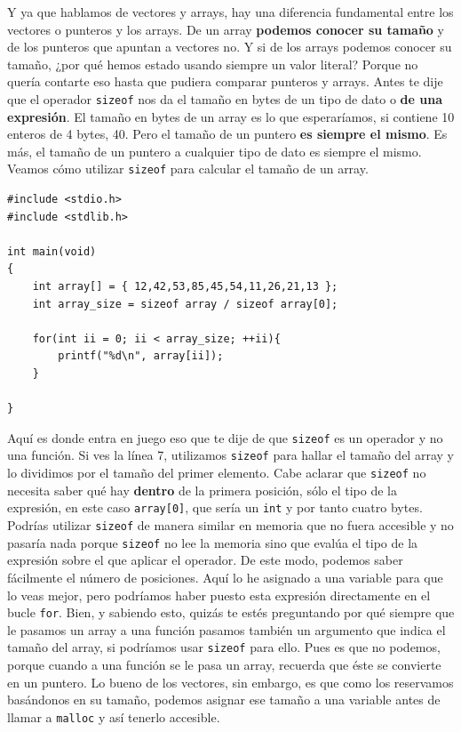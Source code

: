 \documentclass[a4paper]{article}
\begin{document}
Y ya que hablamos de vectores y arrays, hay una diferencia fundamental entre
los vectores o punteros y los arrays. De un array \textbf{podemos conocer su
tamaño} y de los punteros que apuntan a vectores no. Y si de los arrays podemos
conocer su tamaño, ¿por qué hemos estado usando siempre un valor literal? Porque
no quería contarte eso hasta que pudiera comparar punteros y arrays. Antes te
dije que el operador \verb!sizeof! nos da el tamaño en bytes de un tipo de dato
o \textbf{de una expresión}. El tamaño en bytes de un array es lo que
esperaríamos, si contiene 10 enteros de 4 bytes, 40. Pero el tamaño de un
puntero \textbf{es siempre el mismo}. Es más, el tamaño de un puntero a
cualquier tipo de dato es siempre el mismo. Veamos cómo utilizar \verb!sizeof!
para calcular el tamaño de un array.

\noindent
\begin{minipage}[H]{\linewidth}
\mbox{}
\begin{lstlisting}[style=C, label={lst:sizeofArraysPointers}, caption={Diferencia entre \texttt{sizeof} con punteros y arrays}]
#include <stdio.h>
#include <stdlib.h>

int main(void)
{
    int array[] = { 12,42,53,85,45,54,11,26,21,13 };
    int array_size = sizeof array / sizeof array[0];

    for(int ii = 0; ii < array_size; ++ii){
        printf("%d\n", array[ii]);
    }

}
\end{lstlisting}
\end{minipage}

Aquí es donde entra en juego eso que te dije de que \verb!sizeof! es un operador
y no una función. Si ves la línea 7, utilizamos \verb!sizeof! para hallar el
tamaño del array y lo dividimos por el tamaño del primer elemento.
Cabe aclarar que \verb!sizeof! no necesita saber qué hay \textbf{dentro} de
la primera posición, sólo el tipo de la expresión, en este caso \verb!array[0]!,
que sería un \verb!int! y por tanto cuatro bytes. Podrías utilizar \verb!sizeof!
de manera similar en memoria que no fuera accesible y no pasaría nada porque
\verb!sizeof! no lee la memoria sino que evalúa el tipo de la expresión sobre el
que aplicar el operador.
De este
modo, podemos saber fácilmente el número de posiciones. Aquí lo he asignado
a una variable para que lo veas mejor, pero podríamos haber puesto esta
expresión directamente en el bucle \verb!for!. Bien, y sabiendo esto, quizás
te estés preguntando por qué siempre que le pasamos un array a una función
pasamos también un argumento que indica el tamaño del array, si podríamos usar
\verb!sizeof! para ello. Pues es que no podemos, porque cuando a una función se
le pasa un array, recuerda que éste se convierte en un puntero. Lo bueno de los
vectores, sin embargo, es que como los reservamos basándonos en su tamaño,
podemos asignar ese tamaño a una variable antes de llamar a \verb!malloc! y
así tenerlo accesible.
\end{document}
